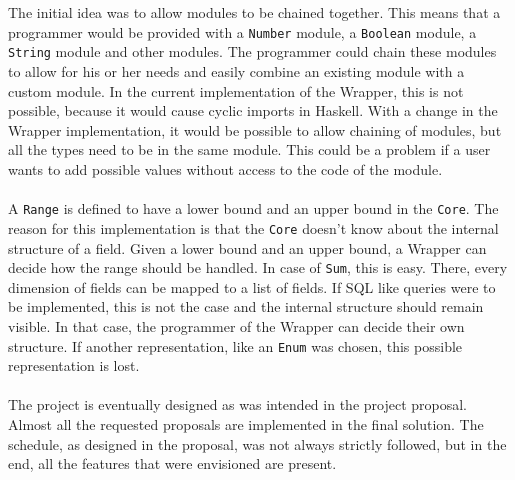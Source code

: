 \documentclass{article}
\begin{document}
\\\\
The initial idea was to allow modules to be chained together. This means that a programmer would be provided with a \texttt{Number} module, a \texttt{Boolean} module, a \texttt{String} module and other modules. The programmer could chain these modules to allow for his or her needs and easily combine an existing module with a custom module. In the current implementation of the Wrapper, this is not possible, because it would cause cyclic imports in Haskell. With a change in the Wrapper implementation, it would be possible to allow chaining of modules, but all the types need to be in the same module. This could be a problem if a user wants to add possible values without access to the code of the module.
\\\\
A \texttt{Range} is defined to have a lower bound and an upper bound in the \texttt{Core}. The reason for this implementation is that the \texttt{Core} doesn't know about the internal structure of a field. Given a lower bound and an upper bound, a Wrapper can decide how the range should be handled. In case of \texttt{Sum}, this is easy. There, every dimension of fields can be mapped to a list of fields. If SQL like queries were to be implemented, this is not the case and the internal structure should remain visible. In that case, the programmer of the Wrapper can decide their own structure. If another representation, like an \texttt{Enum} was chosen, this possible representation is lost.
\\\\
The project is eventually designed as was intended in the project proposal. Almost all the requested proposals are implemented in the final solution. The schedule, as designed in the proposal, was not always strictly followed, but in the end, all the features that were envisioned are present.

	
\end{document}
